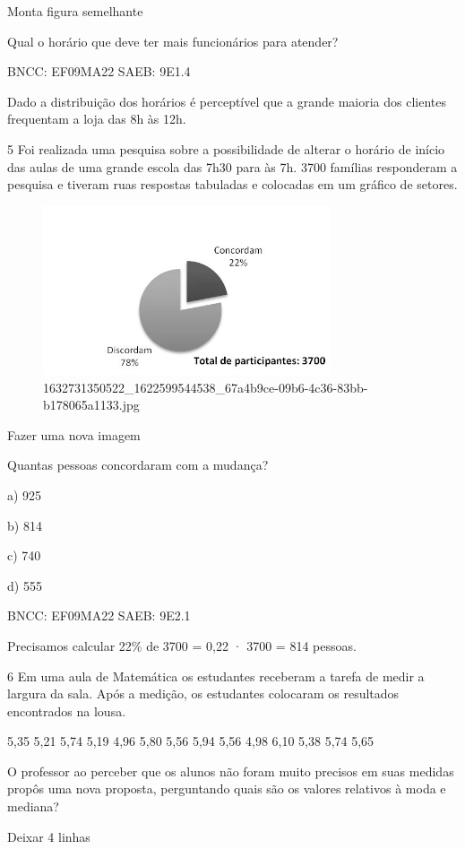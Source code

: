 \begin{escolha}
{{{\begin{escolha}
{{{{{\begin{escolha}
\begin{escolha}
{\begin{q°}
Monta figura semelhante

Qual o horário que deve ter mais funcionários para atender?

BNCC: EF09MA22 SAEB: 9E1.4

Dado a distribuição dos horários é perceptível que a grande maioria dos
clientes frequentam a loja das 8h às 12h.

\num{5} Foi realizada uma pesquisa sobre a possibilidade de alterar o horário
de início das aulas de uma grande escola das 7h30 para às 7h. 3700
famílias responderam a pesquisa e tiveram ruas respostas tabuladas e
colocadas em um gráfico de setores.

\begin{figure}
\centering
\includegraphics[width=3.34677in,height=1.96063in]{./_SAEB_9_MAT/media/image215.jpg}
\caption{1632731350522\_1622599544538\_67a4b9ce-09b6-4c36-83bb-b178065a1133.jpg}
\end{figure}

Fazer uma nova imagem

Quantas pessoas concordaram com a mudança?

a) 925

b) 814

c) 740

d) 555

BNCC: EF09MA22 SAEB: 9E2.1

Precisamos calcular 22\% de 3700 = 0,22 · 3700 = 814 pessoas.

\num{6} Em uma aula de Matemática os estudantes receberam a tarefa de medir a
largura da sala. Após a medição, os estudantes colocaram os resultados
encontrados na lousa.

5,35 5,21 5,74 5,19 4,96 5,80 5,56 5,94 5,56 4,98 6,10 5,38 5,74 5,65

O professor ao perceber que os alunos não foram muito precisos em suas
medidas propôs uma nova proposta, perguntando quais são os valores
relativos à moda e mediana?

Deixar 4 linhas


\end{q°}}
\end{escolha}
\end{escolha}}}}}}
\end{escolha}}}}
\end{escolha}
